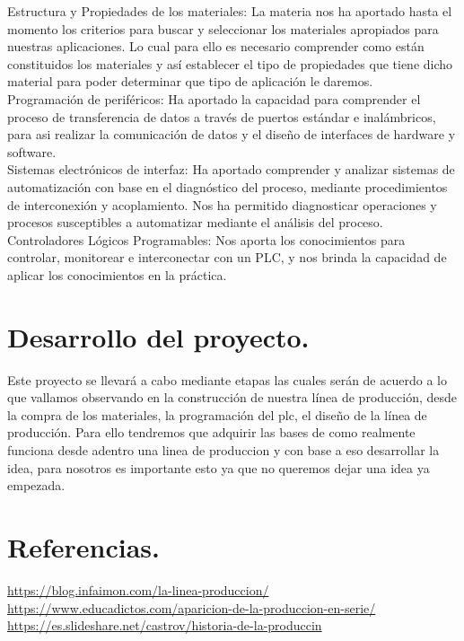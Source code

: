 \documentclass[10pt,a4paper]{article}
\begin{document}
Estructura y Propiedades de los materiales: La materia nos ha aportado hasta el momento los criterios para buscar y seleccionar los materiales apropiados para nuestras aplicaciones.  Lo cual para ello es necesario comprender como están constituidos los materiales y así establecer el tipo de propiedades que tiene dicho material para poder determinar que tipo de aplicación le daremos.\\

Programación de periféricos: Ha aportado la capacidad para comprender el proceso de transferencia de datos a través de puertos estándar e inalámbricos, para asi realizar la comunicación de datos y el diseño de interfaces de hardware y software.\\

Sistemas electrónicos de interfaz: Ha aportado comprender y analizar sistemas de automatización con base en el diagnóstico del proceso, mediante procedimientos de interconexión y acoplamiento. Nos ha permitido diagnosticar operaciones y procesos susceptibles a automatizar mediante el análisis del proceso. \\

Controladores Lógicos Programables: Nos aporta los conocimientos para controlar, monitorear e interconectar con un PLC, y nos brinda la capacidad de aplicar los conocimientos en la práctica.
\section{Desarrollo del proyecto.}
Este proyecto se llevará a cabo mediante etapas las cuales serán de acuerdo a lo que vallamos observando en la construcción de nuestra línea de producción, desde la compra de los materiales, la programación del plc, el diseño de la línea de producción. Para ello tendremos que adquirir las bases de como realmente funciona desde adentro una linea de produccion y con base a eso desarrollar la idea, para nosotros es importante esto ya que no queremos dejar una idea ya empezada. 
\\
\section{Referencias.}
\url{https://blog.infaimon.com/la-linea-produccion/}
\url{https://www.educadictos.com/aparicion-de-la-produccion-en-serie/}
\url{https://es.slideshare.net/castrov/historia-de-la-produccin}
\end{document}
